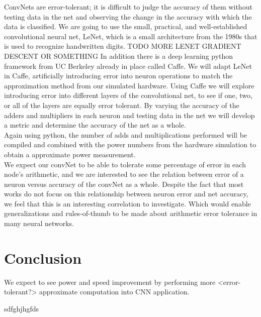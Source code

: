 \documentclass[conference]{IEEEtran}
\begin{document}
	\indent ConvNets are error-tolerant; it is difficult to judge the accuracy of them without testing data in the net and observing the change in  the accuracy with which the data is classified. We are going to use the small, practical, and well-established convolutional neural net, LeNet, which is a small architecture from the 1980s that is used to recognize handwritten digits. TODO MORE LENET GRADIENT DESCENT OR SOMETHING In addition there is a deep learning python framework from UC Berkeley already in place called Caffe. We will adapt LeNet in Caffe, artificially introducing error into neuron operations to match the approximation method from our simulated hardware. Using Caffe we will explore introducing error into different layers of the convolutional net, to see if one, two, or all of the layers are equally error tolerant. By varying the accuracy of the adders and multipliers in each neuron and testing data in the net we will develop a metric and determine the accuracy of the net as a whole.\\

	\indent Again using python, the number of adds and multiplications performed will be compiled and combined with the power numbers from the hardware simulation to obtain a approximate power measurement. \\

	\indent We expect our convNet to be able to tolerate some percentage of error in each node's arithmetic, and we are interested to see the relation between error of a neuron versus accuracy of the convNet as a whole. Despite the fact that most works do not focus on this relationship between neuron error and net accuracy, we feel that this is an interesting correlation to investigate. Which would enable generalizations and rules-of-thumb to be made about arithmetic error tolerance in many neural networks.\\
	

\section{Conclusion}
We expect to see power and speed improvement by performing more <error-tolerant?> approximate computation into CNN application.

\begin{IEEEbiography}{sdfghjhgfds}
\blindtext
\end{IEEEbiography}

\ifCLASSOPTIONcaptionsoff
  \newpage
\fi

\end{document}
